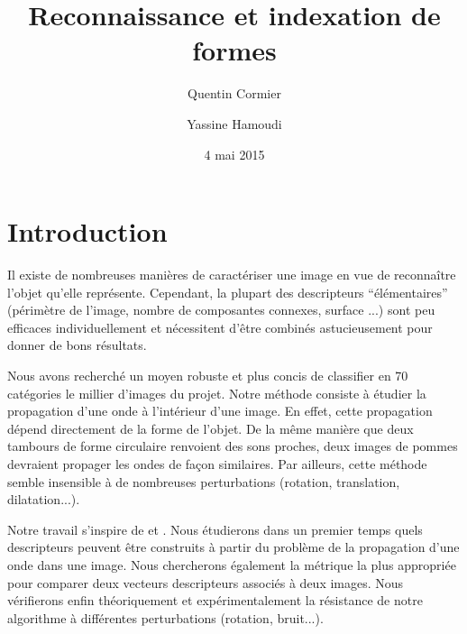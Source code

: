 \documentclass[a4paper,10pt]{article} %
\title{Reconnaissance et indexation de formes}
\author{Quentin Cormier \and Yassine Hamoudi}
\date{4 mai 2015}
\theoremstyle{definition} %
\begin{document}
\maketitle

\tableofcontents


\section{Introduction}

Il existe de nombreuses manières de caractériser une image en vue de reconnaître l'objet qu'elle représente. Cependant, la plupart des descripteurs ``élémentaires'' (périmètre de l'image, nombre de composantes connexes, surface ...) sont peu efficaces individuellement et nécessitent d'être combinés astucieusement pour donner de bons résultats.

Nous avons recherché un moyen robuste et plus concis de classifier en 70 catégories le millier d'images du projet. Notre méthode consiste à étudier la propagation d'une onde à l'intérieur d'une image. En effet, cette propagation dépend directement de la forme de l'objet. De la même manière que deux tambours de forme circulaire renvoient des sons proches, deux images de pommes devraient propager les ondes de façon similaires. Par ailleurs, cette méthode semble insensible à de nombreuses perturbations (rotation, translation, dilatation...).

Notre travail s'inspire de \cite{Zuliani04} et \cite{KhabouHR07}. Nous étudierons dans un premier temps quels descripteurs peuvent être construits à partir du problème de la propagation d'une onde dans une image. Nous chercherons également la métrique la plus appropriée pour comparer deux vecteurs descripteurs associés à deux images. Nous vérifierons enfin théoriquement et expérimentalement la résistance de notre algorithme à différentes perturbations (rotation, bruit...).

\end{document}
